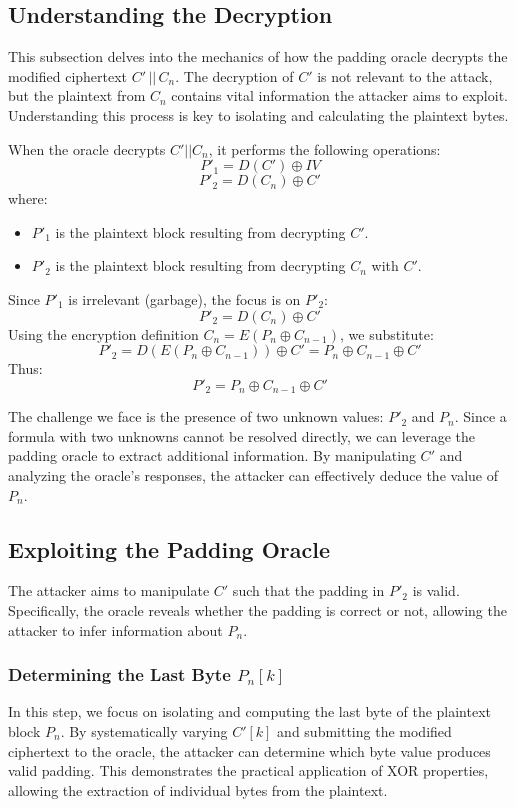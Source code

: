\documentclass[conference]{IEEEtran}
\begin{document}
\subsection{Understanding the Decryption}

This subsection delves into the mechanics of how the padding oracle decrypts the modified ciphertext \( C' \, || \, C_n \). The decryption of \( C' \) is not relevant to the attack, but the plaintext from \( C_n \) contains vital information the attacker aims to exploit. Understanding this process is key to isolating and calculating the plaintext bytes.

When the oracle decrypts \(C' || C_n\), it performs the following operations:
\[
P'_1 = D(C') \oplus IV
\]
\[
P'_2 = D(C_n) \oplus C'
\]
where:
\begin{itemize}
    \item \(P'_1\) is the plaintext block resulting from decrypting \(C'\).
    \item \(P'_2\) is the plaintext block resulting from decrypting \(C_n\) with \(C'\).
\end{itemize}

Since \(P'_1\) is irrelevant (garbage), the focus is on \(P'_2\):
\[
P'_2 = D(C_n) \oplus C'
\]
Using the encryption definition \(C_n = E(P_n \oplus C_{n-1})\), we substitute:
\[
P'_2 = D(E(P_n \oplus C_{n-1})) \oplus C' = P_n \oplus C_{n-1} \oplus C'
\]
Thus:
\[
P'_2 = P_n \oplus C_{n-1} \oplus C'
\]

The challenge we face is the presence of two unknown values: \( P'_{2} \) and \( P_{n} \). Since a formula with two unknowns cannot be resolved directly, we can leverage the padding oracle to extract additional information. By manipulating \( C' \) and analyzing the oracle's responses, the attacker can effectively deduce the value of \( P_{n} \).

\subsection{Exploiting the Padding Oracle}

The attacker aims to manipulate \(C'\) such that the padding in \(P'_2\) is valid. Specifically, the oracle reveals whether the padding is correct or not, allowing the attacker to infer information about \(P_n\).

\subsubsection{Determining the Last Byte \(P_n[k]\)}
In this step, we focus on isolating and computing the last byte of the plaintext block \(P_n\). By systematically varying \(C'[k]\) and submitting the modified ciphertext to the oracle, the attacker can determine which byte value produces valid padding. This demonstrates the practical application of XOR properties, allowing the extraction of individual bytes from the plaintext.
\end{document}
